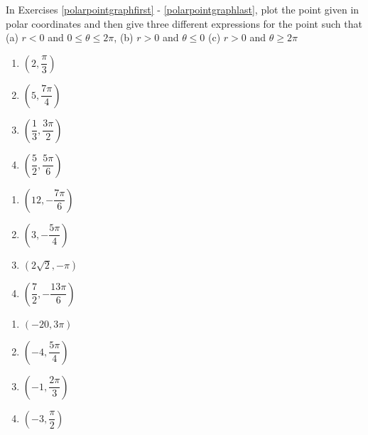 In Exercises \ref{polarpointgraphfirst} - \ref{polarpointgraphlast}, plot the point given in polar coordinates and then give three different expressions for the point such that \hfill (a) $r < 0$ and $0 \leq \theta \leq 2\pi$, \hfill (b) $r > 0$ and $\theta \leq 0$ \hfill (c) $r > 0$ and $\theta \geq 2\pi$

\begin{multicols}{4}

\begin{enumerate}

\item $\left( 2, \dfrac{\pi}{3} \right)$  \label{polarpointgraphfirst}
\item $\left( 5, \dfrac{7\pi}{4} \right)$
\item $\left( \dfrac{1}{3}, \dfrac{3\pi}{2} \right)$
\item $\left( \dfrac{5}{2}, \dfrac{5\pi}{6} \right)$

\setcounter{HW}{\value{enumi}}

\end{enumerate}

\end{multicols}

\begin{multicols}{4} 

\begin{enumerate}

\setcounter{enumi}{\value{HW}}

\item $\left( 12, -\dfrac{7\pi}{6} \right)$
\item $\left( 3, -\dfrac{5\pi}{4} \right)$
\item $\left( 2\sqrt{2}, -\pi \right)$ 
\item $\left( \dfrac{7}{2}, -\dfrac{13\pi}{6} \right)$

\setcounter{HW}{\value{enumi}}

\end{enumerate}

\end{multicols}

\begin{multicols}{4} 

\begin{enumerate}

\setcounter{enumi}{\value{HW}}

\item $\left( -20, 3\pi \right)$ 
\item $\left( -4, \dfrac{5\pi}{4} \right)$
\item $\left( -1, \dfrac{2\pi}{3} \right)$
\item $\left( -3, \dfrac{\pi}{2} \right)$ 

\setcounter{HW}{\value{enumi}}

\end{enumerate}

\end{multicols}

